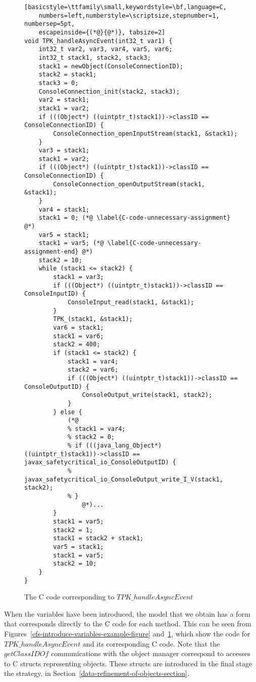 \begin{figure}[tp!]
  \centering
  \setlength{\zedtab}{0.5cm}
  \setlength{\zedindent}{0pt}
  \setlength{\zedleftsep}{0pt}
  \setlength{\abovedisplayskip}{0pt}
  \setlength{\belowdisplayskip}{0pt}
  \setlength{\abovedisplayshortskip}{0pt}
  \setlength{\belowdisplayshortskip}{0pt}
  \begin{lstlisting}[basicstyle=\ttfamily\small,keywordstyle=\bf,language=C,
    numbers=left,numberstyle=\scriptsize,stepnumber=1, numbersep=5pt,
    escapeinside={(*@}{@*)}, tabsize=2]
void TPK_handleAsyncEvent(int32_t var1) {
	int32_t var2, var3, var4, var5, var6;
	int32_t stack1, stack2, stack3;
	stack1 = newObject(ConsoleConnectionID);
	stack2 = stack1;
	stack3 = 0;
	ConsoleConnection_init(stack2, stack3);
	var2 = stack1;
	stack1 = var2;
	if (((Object*) ((uintptr_t)stack1))->classID == ConsoleConnectionID) {
		ConsoleConnection_openInputStream(stack1, &stack1);
	}
	var3 = stack1;
	stack1 = var2;
	if (((Object*) ((uintptr_t)stack1))->classID == ConsoleConnectionID) {
		ConsoleConnection_openOutputStream(stack1, &stack1);
	}
	var4 = stack1;
	stack1 = 0; (*@ \label{C-code-unnecessary-assignment} @*)
	var5 = stack1;
	stack1 = var5; (*@ \label{C-code-unnecessary-assignment-end} @*) 
	stack2 = 10;
	while (stack1 <= stack2) {
		stack1 = var3;
		if (((Object*) ((uintptr_t)stack1))->classID == ConsoleInputID) {
			ConsoleInput_read(stack1, &stack1);
		}
		TPK_(stack1, &stack1);
		var6 = stack1;
		stack1 = var6;
		stack2 = 400;
		if (stack1 <= stack2) {
			stack1 = var4;
			stack2 = var6;
			if (((Object*) ((uintptr_t)stack1))->classID == ConsoleOutputID) {
				ConsoleOutput_write(stack1, stack2);
			}
		} else {
			(*@        
			% stack1 = var4;
			% stack2 = 0;
			% if (((java_lang_Object*)  ((uintptr_t)stack1))->classID == javax_safetycritical_io_ConsoleOutputID) {
			% 	javax_safetycritical_io_ConsoleOutput_write_I_V(stack1, stack2);
			% }
                @*)...      
		}
		stack1 = var5;
		stack2 = 1;
		stack1 = stack2 + stack1;
		var5 = stack1;
		stack1 = var5;
		stack2 = 10;
	}
}
\end{lstlisting}
  \caption{The C code corresponding to $TPK\_handleAsyncEvent$}
  \label{efs-introduce-variables-c-code-figure}
\end{figure}

When the variables have been introduced, the model that we obtain has
a form that corresponds directly to the C code for each method.
This can be seen from
Figures~\ref{efs-introduce-variables-example-figure}
and~\ref{efs-introduce-variables-c-code-figure}, which show the
\Circus{} code for $TPK\_handleAsyncEvent$ and its corresponding C
code.
Note that the $getClassIDOf$ communications with the object manager
correspond to accesses to C structs representing objects.
These structs are introduced in the final stage the strategy, in
Section~\ref{data-refinement-of-objects-section}.
